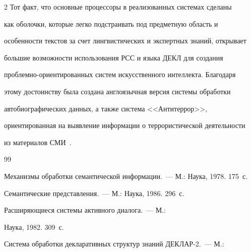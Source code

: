 \begin{multicols}{2}
 Тот факт, что основные процессоры в реализованных системах сделаны


как оболочки, которые легко подстраивать под предметную область и


особенности текстов за счет лингвистических и экспертных знаний, открывает


большие возможности использования РСС и языка ДЕКЛ для создания


проб\-лем\-но-ори\-ен\-ти\-ро\-ван\-ных систем искусственного интеллекта. Благодаря


этому достоинству была создана англоязычная версия системы обработки


автобиографических данных, а также система <<Антитеррор>>,


ориентированная на выявление информации о террористической деятельности


из материалов СМИ~\cite{ma-l11, ma-l12}.





\vspace*{-6pt}








{\small\frenchspacing


 {%




 \begin{thebibliography}{99}









Механизмы обработки семантической информации.~--- М.: Наука, 1978. 175~с.






 Семантические представления.~--- М.: Наука, 1986. 296~с.




 Расширяющиеся системы активного диалога.~--- М.:


Наука, 1982. 309~с.






Сис\-те\-ма обработки декларативных структур знаний \mbox{ДЕКЛАР-2}.~--- М.:



\end{thebibliography}}}
\end{multicols}
